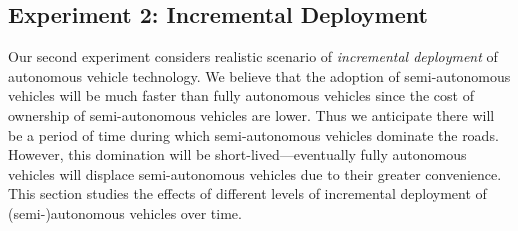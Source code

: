 






\subsection{Experiment 2: Incremental Deployment}

Our second experiment considers realistic scenario of
\emph{incremental deployment} of autonomous vehicle technology.  We
believe that the adoption of semi-autonomous vehicles will be much
faster than fully autonomous vehicles since the cost of ownership of
semi-autonomous vehicles are lower.  Thus we anticipate there will be
a period of time during which semi-autonomous vehicles dominate the roads.
However, this domination will be short-lived---eventually fully autonomous
vehicles will displace semi-autonomous vehicles due to their greater
 convenience.  This section studies the
effects of different levels of incremental deployment of
(semi-)autonomous vehicles over time.

